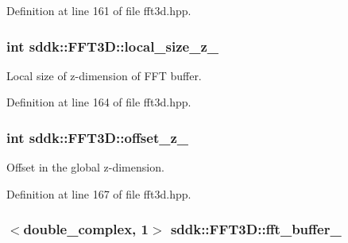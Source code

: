 Definition at line 161 of file fft3d.\+hpp.

\hypertarget{classsddk_1_1_f_f_t3_d_a999766ae41a3fbe1d8c2643eba850ba6}{}
\subsubsection[{local\+\_\+size\+\_\+z\+\_\+}]{\setlength{\rightskip}{0pt plus 5cm}int sddk\+::\+F\+F\+T3\+D\+::local\+\_\+size\+\_\+z\+\_\+\hspace{0.3cm}{\ttfamily [protected]}}\label{classsddk_1_1_f_f_t3_d_a999766ae41a3fbe1d8c2643eba850ba6}


Local size of z-\/dimension of F\+F\+T buffer. 



Definition at line 164 of file fft3d.\+hpp.

\hypertarget{classsddk_1_1_f_f_t3_d_a57e693bd91fbce44258bbcaa1a7991ea}{}
\subsubsection[{offset\+\_\+z\+\_\+}]{\setlength{\rightskip}{0pt plus 5cm}int sddk\+::\+F\+F\+T3\+D\+::offset\+\_\+z\+\_\+\hspace{0.3cm}{\ttfamily [protected]}}\label{classsddk_1_1_f_f_t3_d_a57e693bd91fbce44258bbcaa1a7991ea}


Offset in the global z-\/dimension. 



Definition at line 167 of file fft3d.\+hpp.

\hypertarget{classsddk_1_1_f_f_t3_d_a6483ea5038aceb6cd74c9ca94a37eaac}{}
\subsubsection[{fft\+\_\+buffer\+\_\+}]{$<$double\+\_\+complex, 1$>$ sddk\+::\+F\+F\+T3\+D\+::fft\+\_\+buffer\+\_\+\hspace{0.3cm}{\ttfamily [protected]}}\label{classsddk_1_1_f_f_t3_d_a6483ea5038aceb6cd74c9ca94a37eaac}


